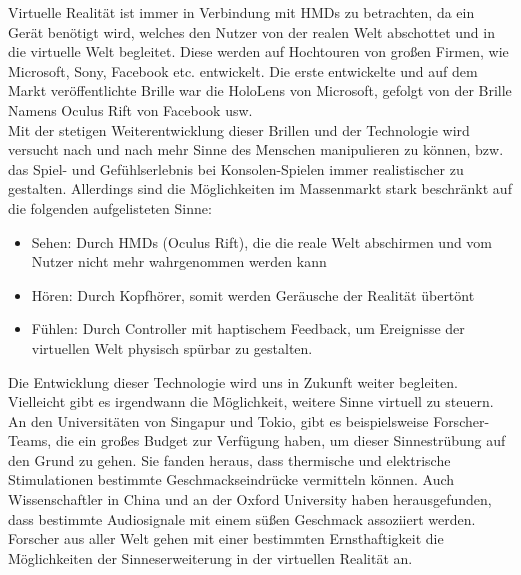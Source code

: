 Virtuelle Realität ist immer in Verbindung mit \acl{HMD}s zu betrachten, da ein Gerät benötigt wird, welches den Nutzer von der realen Welt 
abschottet und in die virtuelle Welt begleitet. Diese werden auf Hochtouren von großen Firmen, wie Microsoft, Sony, Facebook etc. entwickelt. 
Die erste entwickelte und auf dem Markt veröffentlichte Brille war die HoloLens von Microsoft, gefolgt von der Brille Namens Oculus Rift von 
Facebook usw. 
\\ 
Mit der stetigen Weiterentwicklung dieser Brillen und der Technologie wird versucht nach und nach mehr Sinne des Menschen manipulieren zu 
können, bzw. das Spiel- und Gefühlserlebnis bei Konsolen-Spielen immer realistischer zu gestalten. Allerdings sind die Möglichkeiten im 
Massenmarkt stark beschränkt auf die folgenden aufgelisteten Sinne: 
\begin{itemize}
    \item Sehen: Durch \acl{HMD}s (Oculus Rift), die die reale Welt abschirmen und vom Nutzer nicht mehr wahrgenommen werden kann
    \item Hören: Durch Kopfhörer, somit werden Geräusche der Realität übertönt 
    \item Fühlen: Durch Controller mit haptischem Feedback, um Ereignisse der virtuellen Welt physisch spürbar zu gestalten. 
\end{itemize}
Die Entwicklung dieser Technologie wird uns in Zukunft weiter begleiten. Vielleicht gibt es irgendwann die Möglichkeit, weitere Sinne virtuell 
zu steuern. An den Universitäten von Singapur und Tokio, gibt es beispielsweise Forscher-Teams, die ein großes Budget zur Verfügung haben, 
um dieser Sinnestrübung auf den Grund zu gehen. Sie fanden heraus, dass thermische und elektrische Stimulationen bestimmte Geschmackseindrücke 
vermitteln können. Auch Wissenschaftler in China und an der Oxford University haben herausgefunden, dass bestimmte Audiosignale mit einem süßen 
Geschmack assoziiert werden. \cite{sinnesforschung.2017m} Forscher aus aller Welt gehen mit einer bestimmten Ernsthaftigkeit die Möglichkeiten 
der Sinneserweiterung in der virtuellen Realität an. 

